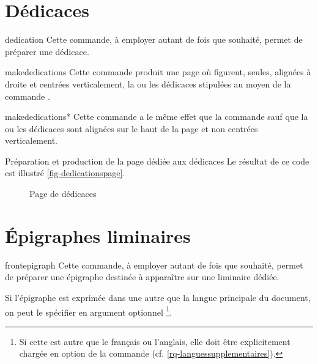\section{Dédicaces}

\begin{docCommand}{dedication}{}
  Cette commande, à employer autant de fois que
  souhaité\hauteurpage{}, permet de préparer une dédicace.
\end{docCommand}

\begin{docCommand}{makededications}{}
  Cette commande produit une page où figurent, seules, alignées à droite et
  centrées verticalement, la ou les dédicaces stipulées au moyen de la commande
  .
\end{docCommand}
%
\begin{docCommand}{makededications*}{}
  Cette commande a le même effet que la commande  sauf
  que la ou les dédicaces sont alignées sur le haut de la page et non centrées
  verticalement.
\end{docCommand}

\begin{dbexample}{Préparation et production de la page dédiée aux dédicaces}{}
  \NoAutoSpacing%
%
  Le résultat de ce code est illustré \vref{fig-dedicationspage}.
\end{dbexample}

\begin{figure}[htbp]
  \centering
  \caption{Page de dédicaces}
  \label{fig-dedicationspage}
\end{figure}

\section{Épigraphes liminaires}

\begin{docCommand}{frontepigraph}{}
  Cette commande, à employer autant de fois que souhaité\hauteurpage{}, permet
  de préparer une épigraphe destinée à apparaître sur une \gls{liminaire}
  dédiée.

  Si l'épigraphe est exprimée dans une   autre que la langue principale du document, on peut le
  spécifier en argument optionnel%
  \footnote{Si cette  est autre que le français ou l'anglais, elle
    doit être explicitement chargée en option de la commande
     (cf.  \vref{rq-languessupplementaires}).}.
\end{docCommand}

